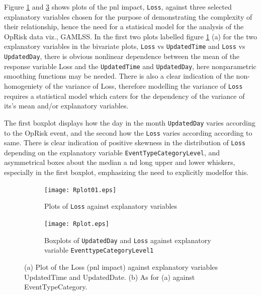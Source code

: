 \documentclass{DissertateUSU}
\begin{document}
Figure \ref{fourLossplot1} and \ref{fourLossplot2} shows plots of the
pnl impact, \texttt{Loss}, against three selected explanatory variables
chosen for the purpose of demonstrating the complexity of their
relationship, hence the need for a statisical model for the analysis of
the OpRisk data viz., GAMLSS. In the first two plots labelled figure
\ref{fourLossplot1} (a) for the two explanatory variables in the
bivariate plots, \texttt{Loss} vs \texttt{UpdatedTime} and \texttt{Loss}
vs \texttt{UpdatedDay}, there is obvious nonlinear dependence between
the mean of the response variable Loss and the \texttt{UpdatedTime} and
\texttt{UpdatedDay}, here nonparametric smoothing functions may be
needed. There is also a clear indication of the non-homogeniety of the
variance of Loss, therefore modelling the variance of \texttt{Loss}
requires a statistical model which caters for the dependency of the
variance of its's mean and/or explanatory variables.\medskip

\singlespacing

\doublespacing

The first boxplot displays how the day in the month \texttt{UpdatedDay}
varies according to the OpRisk event, and the second how the
\texttt{Loss} varies according according to same. There is clear
indication of positive skewness in the distribution of \texttt{Loss}
depending on the explanatory variable \texttt{EventTypeCategoryLevel},
and asymmetrical boxes about the median a nd long upper and lower
whiskers, especially in the first boxplot, emphasizing the need to
explicitly modelfor this.

\begin{figure}
\centering
\begin{subfigure}[b]{0.5\textwidth}
   \texttt{[image: Rplot01.eps]}
   \caption{Plots of \texttt{Loss} against explanatory variables }
   \label{fourLossplot1} 
\end{subfigure}

\begin{subfigure}[b]{0.5\textwidth}
   \texttt{[image: Rplot.eps]}
   \caption{Boxplots of \texttt{UpdatedDay} and \texttt{Loss} against explanatory variable \texttt{EventtypeCategoryLevel1}}
   \label{fourLossplot2}
\end{subfigure}

\caption[Loss against explanatory variables]{(a) Plot of the Loss (pnl impact) against explanatory variables UpdatedTime and UpdatedDate. (b) As for (a) against EventTypeCategory.}
\end{figure}
\end{document}
